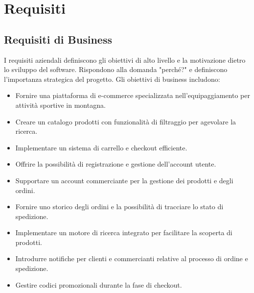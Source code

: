 
\chapter{Requisiti}

\section{Requisiti di Business}
I requisiti aziendali definiscono gli obiettivi di alto livello e la motivazione dietro lo sviluppo del software. Rispondono alla domanda "perché?" e definiscono l'importanza strategica del progetto.
Gli obiettivi di business includono:
\begin{itemize}
    \item Fornire una piattaforma di e-commerce specializzata nell'equipaggiamento per attività sportive in montagna.
    \item Creare un catalogo prodotti con funzionalità di filtraggio per agevolare la ricerca.
    \item Implementare un sistema di carrello e checkout efficiente.
    \item Offrire la possibilità di registrazione e gestione dell'account utente.
    \item Supportare un account commerciante per la gestione dei prodotti e degli ordini.
    \item Fornire uno storico degli ordini e la possibilità di tracciare lo stato di spedizione.
    \item Implementare un motore di ricerca integrato per facilitare la scoperta di prodotti.
    \item Introdurre notifiche per clienti e commercianti relative al processo di ordine e spedizione.
    \item Gestire codici promozionali durante la fase di checkout.
\end{itemize}

